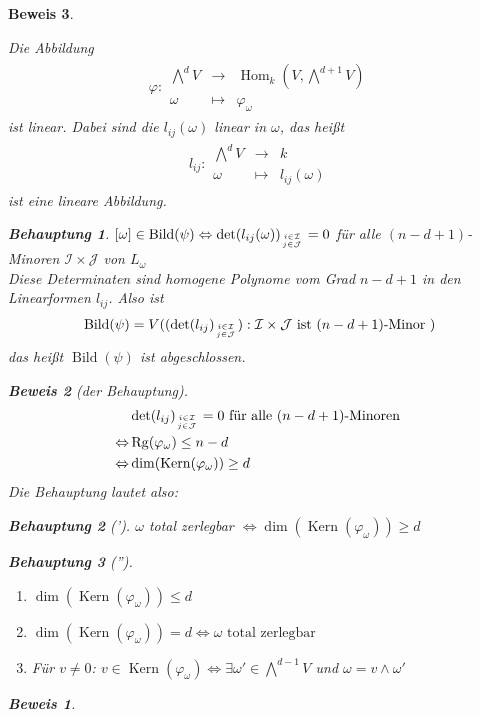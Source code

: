 \documentclass[a4paper,12pt]{report}
\theoremstyle{break}
\theoremstyle{nonumberbreak}
\newtheorem{Beh}{Behauptung}
\theoremstyle{nonumberplain}
\newtheorem{Bew}{Beweis}
\newcommand{\Abb}[5]{\ensuremath{#1:\begin{array}{ccc} #2 & \longrightarrow & #3 \\ #4 & \longmapsto & #5 \end{array}}}
\DeclareMathOperator{\Hom}{Hom}
\DeclareMathOperator{\Kern}{Kern}
\DeclareMathOperator{\Bild}{Bild}
\DeclareMathOperator{\Rg}{Rg}
\begin{document}
\begin{Bew}
\begin{enumerate}
Die Abbildung
\begin{align*}
    \Abb{\varphi}{\bigwedge^dV}{\Hom_k(V,\bigwedge^{d+1}V)}{\omega}{\varphi_\omega}
\end{align*}
ist linear.
Dabei sind die $l_{ij}(\omega)$ linear in $\omega$, das heißt
\begin{align*}
\Abb{l_{ij}}{\bigwedge^dV}{k}{\omega}{l_{ij}(\omega)}
\end{align*}
ist eine lineare Abbildung.
  \begin{Beh}
    $[\omega]\in\Bild(\psi)\Leftrightarrow\det(l_{ij}(\omega))_{i\in\mathcal I\atop j \in\mathcal J}=0$
  für alle $(n-d+1)$-Minoren $\mathcal I\times\mathcal J$ von $L_\omega$ \\
  Diese Determinaten sind homogene Polynome vom Grad $n-d+1$ in den Linearformen $l_{ij}$. Also ist 
  \begin{align*}
    \Bild(\psi)=V((\det(l_{ij})_{i\in\mathcal I\atop j \in\mathcal J}):\mathcal I\times\mathcal J
    \text{ ist $(n-d+1)$-Minor })
  \end{align*}
  das heißt $\Bild(\psi)$ ist abgeschlossen.
  \end{Beh}
  \begin{Bew}[der Behauptung]
    \begin{align*}
      & \det(l_{ij})_{i\in\mathcal I\atop j \in\mathcal J}=0\text{ für alle $(n-d+1)$-Minoren } \\
      \Leftrightarrow & \Rg(\varphi_\omega)\leq n-d \\
      \Leftrightarrow & \dim(\Kern(\varphi_\omega))\geq d
    \end{align*}
    Die Behauptung lautet also:
    \begin{Beh}[']
      $\omega$ total zerlegbar $\Leftrightarrow \dim(\Kern(\varphi_\omega))\geq d$
    \end{Beh}
    \begin{Beh}['']
      \begin{enumerate}
      \item $\dim(\Kern(\varphi_\omega))\leq d$
      \item $\dim(\Kern(\varphi_\omega))=d\Leftrightarrow \omega\text{ total zerlegbar }$
      \item Für $v\neq0$: $v\in\Kern(\varphi_\omega)\Leftrightarrow\exists\omega'\in\bigwedge^{d-1}V$ und $\omega=v\wedge\omega'$
      \end{enumerate}
    \end{Beh}
    \begin{Bew}
      \begin{enumerate}

\end{enumerate}
\end{Bew}
\end{Bew}
\end{enumerate}
\end{Bew}
\end{document}
